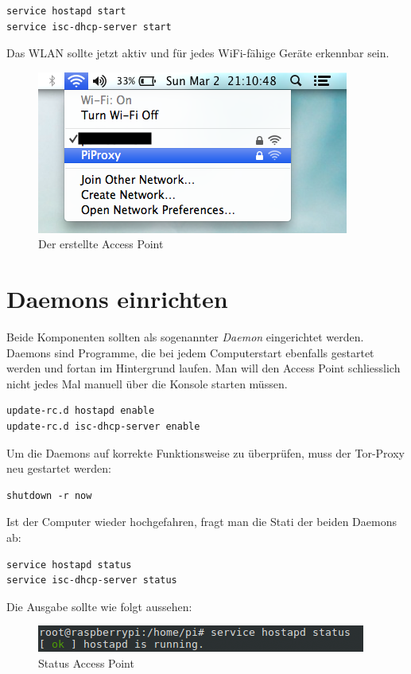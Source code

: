\begin{lstlisting}
service hostapd start
service isc-dhcp-server start
\end{lstlisting}

Das WLAN sollte jetzt aktiv und für jedes WiFi-fähige Geräte erkennbar sein.

\begin{figure}[H]
\centering
\includegraphics[scale=0.7]{images/accesspoint}
\caption{Der erstellte Access Point}
\end{figure}

\section{Daemons einrichten}
Beide Komponenten sollten als sogenannter \textit{Daemon} eingerichtet werden. Daemons sind Programme, die bei jedem Computerstart ebenfalls gestartet werden und fortan im Hintergrund laufen. Man will den Access Point schliesslich nicht jedes Mal manuell über die Konsole starten müssen. 

\begin{lstlisting}
update-rc.d hostapd enable 
update-rc.d isc-dhcp-server enable
\end{lstlisting}

Um die Daemons auf korrekte Funktionsweise zu überprüfen, muss der Tor-Proxy neu gestartet werden:

\begin{lstlisting}
shutdown -r now 
\end{lstlisting}

Ist der Computer wieder hochgefahren, fragt man die Stati der beiden Daemons ab:

\begin{lstlisting}
service hostapd status
service isc-dhcp-server status
\end{lstlisting}

Die Ausgabe sollte wie folgt aussehen: 

\begin{figure}[H]
\centering
\includegraphics[scale=0.7]{images/hostapd_status}
\caption{Status Access Point}
\end{figure}

